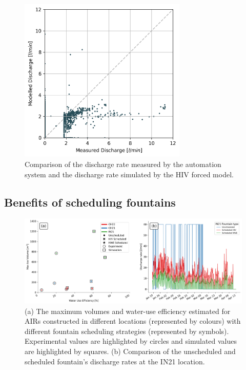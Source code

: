 \documentclass[tc, manuscript]{copernicus}
\begin{document}
\begin{figure}[t]
\includegraphics[width=8cm]{Figures/simvsreal2.png}

\caption{ Comparison of the discharge rate measured by the automation system and the discharge rate simulated by the HIV
forced model. }

\label{fig:simvsreal}
\end{figure}

\subsection{Benefits of scheduling fountains}

\begin{figure}[t]
\includegraphics[width=\textwidth]{Figures/wue.png}

\caption{(a) The maximum volumes and water-use efficiency estimated for AIRs constructed in different locations
(represented by colours) with different fountain scheduling strategies (represented by symbols). Experimental
values are highlighted by circles and simulated values are highlighted by squares. (b) Comparison of
the unscheduled and scheduled fountain's discharge rates at the IN21 location.}

\label{fig:wue}
\end{figure}
\end{document}
